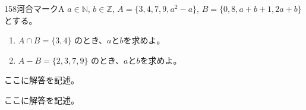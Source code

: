 \begin{thm}{158}{}{河合マークA}
 $a\in\mathbb{N}$, $b\in\mathbb{Z}$, $A=\{3, 4, 7, 9, a^2-a\}$, $B=\{0, 8, a+b+1, 2a+b\}$ とする。
 \begin{enumerate}
  \item $A\cap B = \{3, 4\}$ のとき、$a$と$b$を求めよ。
  \item $A-B = \{2, 3, 7, 9\}$ のとき、$a$と$b$を求めよ。
 \end{enumerate}
\end{thm}

ここに解答を記述。

ここに解答を記述。